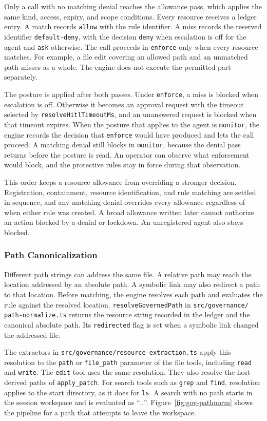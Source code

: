 {Only a call with no matching denial reaches the allowance pass, which applies
the same kind, access, expiry, and scope conditions. Every resource receives a
ledger entry. A match records \texttt{allow} with the rule identifier. A miss
records the reserved identifier \texttt{default-deny}, with the decision
\texttt{deny} when escalation is off for the agent and \texttt{ask} otherwise.
The call proceeds in \texttt{enforce} only when every resource matches. For
example, a file edit covering an allowed path and an unmatched path misses
as a whole. The engine does not execute the permitted part separately.

The posture is applied after both passes. Under \texttt{enforce}, a miss is
blocked when escalation is off. Otherwise it becomes an approval request with
the timeout selected by \texttt{resolveHitlTimeoutMs}, and an unanswered
request is blocked when that timeout expires. When the posture that applies
to the agent is \texttt{monitor}, the engine records the decision that
\texttt{enforce} would have produced and lets the call proceed. A matching
denial still blocks in \texttt{monitor}, because the denial pass returns
before the posture is read. An operator can observe what enforcement would
block, and the protective rules stay in force during that observation.

This order keeps a resource allowance from overriding a stronger decision.
Registration, containment, resource identification, and rule matching are
settled in sequence, and any matching denial overrides every allowance
regardless of when either rule was created. A broad allowance written later
cannot authorize an action blocked by a denial or lockdown. An unregistered
agent also stays blocked.}

\FloatBarrier
\subsubsection{Path Canonicalization}
\label{sec: path-canonz}

{\color{red}Different path strings can address the same file. A relative path may
reach the location addressed by an absolute path. A symbolic link may also
redirect a path to that location. Before matching, the engine resolves each
path and evaluates the rule against the resolved location.
\texttt{resolveGovernedPath} in \texttt{src/governance/\break
path-normalize.ts} returns the resource string recorded in the ledger and the
canonical absolute path. Its \texttt{redirected} flag is set when a symbolic
link changed the addressed file.

The extractors in \texttt{src/governance/\allowbreak resource-extraction.ts} apply this
resolution to the \texttt{path} or \texttt{file\_path} parameter of the file
tools, including \texttt{read} and \texttt{write}. The \texttt{edit} tool uses
the same resolution. They also resolve the host-derived paths of
\texttt{apply\_patch}. For search tools such as \texttt{grep} and \texttt{find},
resolution applies to the start directory, as it does for \texttt{ls}. A search with no path starts in
the session workspace and is evaluated as ``\texttt{.}''.
Figure~\ref{fig:gov-pathnorm} shows the pipeline for a path that attempts to
leave the workspace.}

